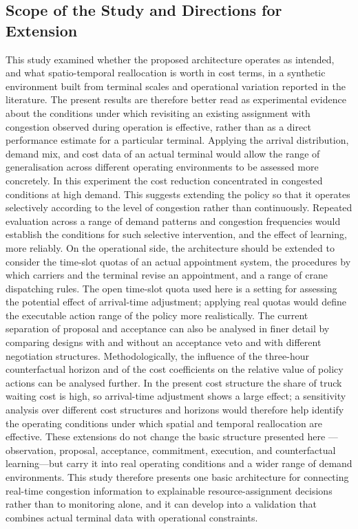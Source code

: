 \subsection{Scope of the Study and Directions for Extension}
\label{sec:scope}
This study examined whether the proposed architecture operates as
intended, and what spatio-temporal reallocation is worth in cost terms,
in a synthetic environment built from terminal scales and operational
variation reported in the literature. The present results are therefore
better read as experimental evidence about the conditions under which
revisiting an existing assignment with congestion observed during
operation is effective, rather than as a direct performance estimate for
a particular terminal. Applying the arrival distribution, demand mix,
and cost data of an actual terminal would allow the range of
generalisation across different operating environments to be assessed
more concretely.
In this experiment the cost reduction concentrated in congested
conditions at high demand. This suggests extending the policy so that it
operates selectively according to the level of congestion rather than
continuously. Repeated evaluation across a range of demand patterns and
congestion frequencies would establish the conditions for such selective
intervention, and the effect of learning, more reliably.
On the operational side, the architecture should be extended to consider
the time-slot quotas of an actual appointment system, the procedures by
which carriers and the terminal revise an appointment, and a range of
crane dispatching rules. The open time-slot quota used here is a setting
for assessing the potential effect of arrival-time adjustment; applying
real quotas would define the executable action range of the policy more
realistically. The current separation of proposal and acceptance can
also be analysed in finer detail by comparing designs with and without
an acceptance veto and with different negotiation structures.
Methodologically, the influence of the three-hour counterfactual horizon
and of the cost coefficients on the relative value of policy actions can
be analysed further. In the present cost structure the share of truck
waiting cost is high, so arrival-time adjustment shows a large effect; a
sensitivity analysis over different cost structures and horizons would
therefore help identify the operating conditions under which spatial and
temporal reallocation are effective.
These extensions do not change the basic structure presented here
---observation, proposal, acceptance, commitment, execution, and
counterfactual learning---but carry it into real operating conditions
and a wider range of demand environments. This study therefore presents
one basic architecture for connecting real-time congestion information
to explainable resource-assignment decisions rather than to monitoring
alone, and it can develop into a validation that combines actual
terminal data with operational constraints.
